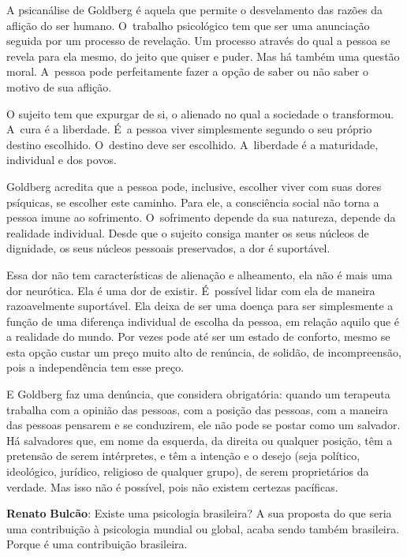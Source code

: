 A psicanálise de Goldberg é aquela que permite o desvelamento das razões
da aflição do ser humano. O~trabalho psicológico tem que ser uma
anunciação seguida por um processo de revelação. Um processo através do
qual a pessoa se revela para ela mesmo, do jeito que quiser e puder. Mas
há também uma questão moral. A~pessoa pode perfeitamente fazer a opção
de saber ou não saber o motivo de sua aflição.

O sujeito tem que expurgar de si, o alienado no qual a sociedade o
transformou. A~cura é a liberdade. É~a pessoa viver simplesmente
segundo o seu próprio destino escolhido. O~destino deve ser escolhido. A~liberdade é a maturidade, individual e dos povos.

Goldberg acredita que a pessoa pode, inclusive, escolher viver com suas
dores psíquicas, se escolher este caminho. Para ele, a consciência
social não torna a pessoa imune ao sofrimento. O~sofrimento depende da
sua natureza, depende da realidade individual. Desde que o sujeito
consiga manter os seus núcleos de dignidade, os seus núcleos pessoais
preservados, a dor é suportável.

Essa dor não tem características de alienação e alheamento, ela não é
mais uma dor neurótica. Ela é uma dor de existir. É~possível lidar com
ela de maneira razoavelmente suportável. Ela deixa de ser uma doença
para ser simplesmente a função de uma diferença individual de escolha da
pessoa, em relação aquilo que é a realidade do mundo. Por vezes pode até
ser um estado de conforto, mesmo se esta opção custar um preço muito
alto de renúncia, de solidão, de incompreensão, pois a independência tem
esse preço.

E Goldberg faz uma denúncia, que considera obrigatória: quando um
terapeuta trabalha com a opinião das pessoas, com a posição das pessoas,
com a maneira das pessoas pensarem e se conduzirem, ele não pode se
postar como um salvador. Há salvadores que, em nome da esquerda, da
direita ou qualquer posição, têm a pretensão de serem intérpretes, e têm
a intenção e o desejo (seja político, ideológico, jurídico, religioso de
qualquer grupo), de serem proprietários da verdade. Mas isso não é
possível, pois não existem certezas pacíficas.

\begin{center}\asterisc{}\end{center}

  \abrefala

\textbf{Renato} \textbf{Bulcão}: Existe uma psicologia brasileira? A sua
proposta do que seria uma contribuição à psicologia mundial ou global,
acaba sendo também brasileira. Porque é uma contribuição brasileira.

